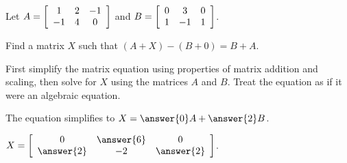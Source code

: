 \documentclass{ximera}
\author{Zack Reed}
\begin{document}
\begin{exercise}
  Let $A = \startmat{ccc}
    1 & 2 & -1 \\
    -1 & 4 & 0 \\
  \stopmat$ and
  $B = \startmat{ccc}
    0 & 3 & 0 \\
    1 & -1 & 1 \\
  \stopmat$.\par\noindent
  Find a matrix $X$ such that $(A+X)-(B+0) = B+A$. 
  
  \begin{hint}
    First simplify the matrix equation using properties of matrix addition and scaling, then solve for $X$ using the matrices $A$ and $B$. Treat the equation as if it were an algebraic equation.
  \end{hint}
  
    The equation simplifies to $X=\answer{0}A+\answer{2}B$.

    $X = \startmat{ccc}
    0 & \answer{6} & 0 \\
    \answer{2} & -2 & \answer{2} \\
    \stopmat$.

\end{exercise}
\end{document}
